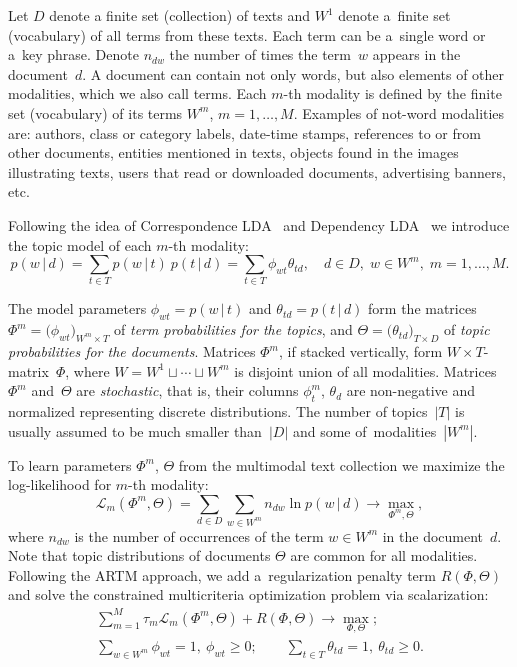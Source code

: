 \documentclass{llncs}
\newcommand{\cond}{\mspace{3mu}{|}\mspace{3mu}}
\newcommand{\cL}{\mathscr{L}}
\begin{document}

Let
$D$ denote a finite set (collection) of texts and
$W^1$ denote a~finite set (vocabulary) of all terms from these texts.
Each term can be a~single word or a~key phrase.
Denote $n_{dw}$ the number of times the term~$w$ appears in the document~$d$.
A document can contain not only words, but also elements of other modalities, which we also call terms.
Each $m$-th modality is defined by the finite set (vocabulary) of its terms $W^m$, ${m=1,\dots,M}$.
Examples of not-word modalities are:
authors,
class or category labels,
date-time stamps,
references to or from other documents,
entities mentioned in texts,
objects found in the images illustrating texts,
users that read or downloaded documents,
advertising banners,
etc.

Following the idea of Correspondence LDA~\cite{blei03modeling}
and Dependency LDA~\cite{rubin12statistical}
we introduce the topic model of each $m$-th modality:
\[
    p(w\cond d)
    = \sum_{t\in T} p(w\cond t)\: p(t\cond d)
    = \sum_{t\in T} \phi_{wt} \theta_{td},
    \quad
    d\in D,\; w\in W^m,\; m=1,\dots,M.
\]

The model parameters
$\phi_{wt}=p(w\cond t)$ and $\theta_{td}=p(t\cond d)$
form the matrices
$\Phi^m = \bigl( \phi_{wt} \bigr)_{W^m\times T}$ of \emph{term probabilities for the topics}, and
$\Theta = \bigl( \theta_{td} \bigr)_{T\times D}$ of \emph{topic probabilities for the documents}.
Matrices $\Phi^m$, if stacked vertically,
form ${W\!\!\times\!T}$-matrix~$\Phi$,
where ${W=W^1\sqcup\cdots\sqcup W^m}$ is disjoint union of all modalities.
Matrices $\Phi^m$ and~$\Theta$ are \emph{stochastic},
that is, their columns $\phi^m_t$, $\theta_d$
are non-negative and normalized representing discrete distributions.
The number of topics~$|T|$ is usually assumed to be
much smaller than~$|D|$ and some of~modalities~$|W^m|$.

To learn parameters $\Phi^m$, $\Theta$ from the multimodal text collection
we maximize the log-likelihood for $m$-th modality:
\[
    \cL_m (\Phi^m,\Theta) =
    \sum_{d\in D}\sum_{w\in W^m} n_{dw} \ln p(w\cond d)
    \to \max_{\Phi^m,\Theta},
\]
where
$n_{dw}$ is the number of occurrences of the term $w\in W^m$ in the document~$d$.
Note that topic distributions of documents $\Theta$ are common for all modalities.
Following the ARTM approach,
we add a~regularization penalty term $R(\Phi,\Theta)$
and solve the constrained multicriteria optimization problem via scalarization:
\begin{gather}
\label{eq:multimodal}
    \sum_{m=1}^M \tau_m \cL_m (\Phi^m,\Theta)
    + R(\Phi,\Theta)
    \to \max_{\Phi,\Theta};
\\\label{eq:multimodal:norm}
    \sum_{w\in W^m}\!\!\! \phi_{wt} = 1,~
    \phi_{wt}\geq 0;
    \qquad
    \sum_{t\in T} \theta_{td} = 1,~
    \theta_{td}\geq 0.
\end{gather}
\end{document}
